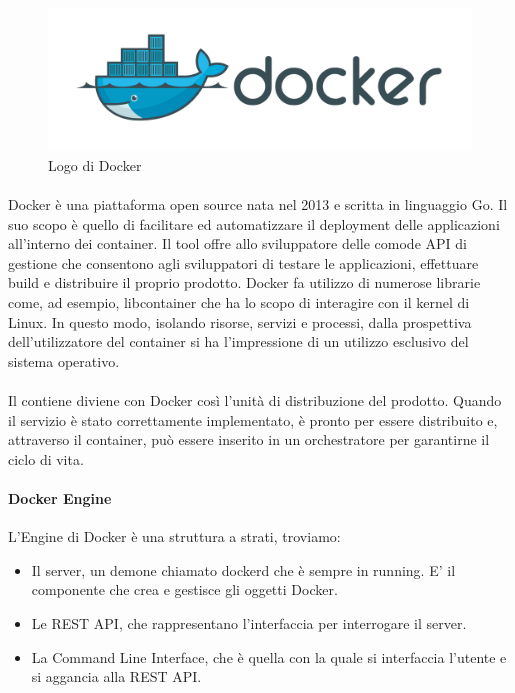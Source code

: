 \begin{figure}[h!]
	\centering
	\includegraphics[width=\textwidth,keepaspectratio=true]{capitoli/imgs/docker.png}
	\caption{Logo di Docker}
\end{figure}

\paragraph{}
Docker è una piattaforma open source nata nel 2013 e scritta in linguaggio Go. Il suo scopo è quello di facilitare ed automatizzare il deployment delle applicazioni all'interno dei container. Il tool offre allo sviluppatore delle comode API di gestione che consentono agli sviluppatori di testare le applicazioni, effettuare build e distribuire il proprio prodotto. Docker fa utilizzo di numerose librarie come, ad esempio, libcontainer che ha lo scopo di interagire con il kernel di Linux.  In questo modo, isolando risorse, servizi e processi, dalla prospettiva dell'utilizzatore del container si ha l'impressione di un utilizzo esclusivo del sistema operativo.

\paragraph{}
Il contiene diviene con Docker così l'unità di distribuzione del prodotto. Quando il servizio è stato correttamente implementato, è pronto per essere distribuito e, attraverso il container, può essere inserito in un orchestratore per garantirne il ciclo di vita.

\paragraph{Docker Engine}
L'Engine di Docker è una struttura a strati, troviamo:
\begin{itemize}
	\item Il server, un demone chiamato dockerd che è sempre in running. E' il componente che crea e gestisce gli oggetti Docker.
	\item Le REST API, che rappresentano l'interfaccia per interrogare il server.
	\item La Command Line Interface, che è quella con la quale si interfaccia l'utente e si aggancia alla REST API.
\end{itemize}

